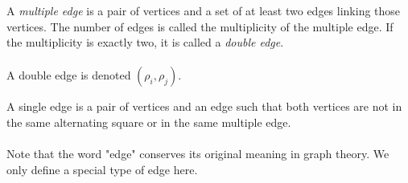 \begin{definition}

  A \textit{multiple edge} is a pair of vertices and a set of at least two edges linking those vertices. The number of edges is called the multiplicity of the multiple edge. If the multiplicity is exactly two, it is called a \textit{double edge}.

  \begin{figure}[H]
    \begin{center}
      \caption{}
    \end{center}
  \end{figure}

  \paragraph{}
  A double edge is denoted $(\rho_i, \rho_j)$.
\end{definition}

\begin{definition}
  \label{single-edge}
  A single edge is a pair of vertices and an edge such that both vertices are not in the same alternating square or in the same multiple edge.
\end{definition}

\paragraph{}
Note that the word "edge" conserves its original meaning in graph theory. We only define a special type of edge here.

